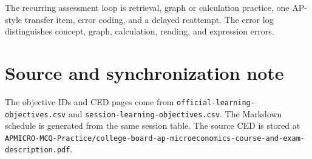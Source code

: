 \documentclass[11pt,a4paper]{article}
\newcommand{\codepath}[1]{\texttt{\small #1}}
\begin{document}
The recurring assessment loop is retrieval, graph or calculation practice, one AP-style transfer item, error coding, and a delayed reattempt. The error log distinguishes concept, graph, calculation, reading, and expression errors.

\section{Source and synchronization note}
The objective IDs and CED pages come from \codepath{official-learning-objectives.csv} and \codepath{session-learning-objectives.csv}. The Markdown schedule is generated from the same session table. The source CED is stored at \codepath{APMICRO-MCQ-Practice/college-board-ap-microeconomics-course-and-exam-description.pdf}.
\end{document}
